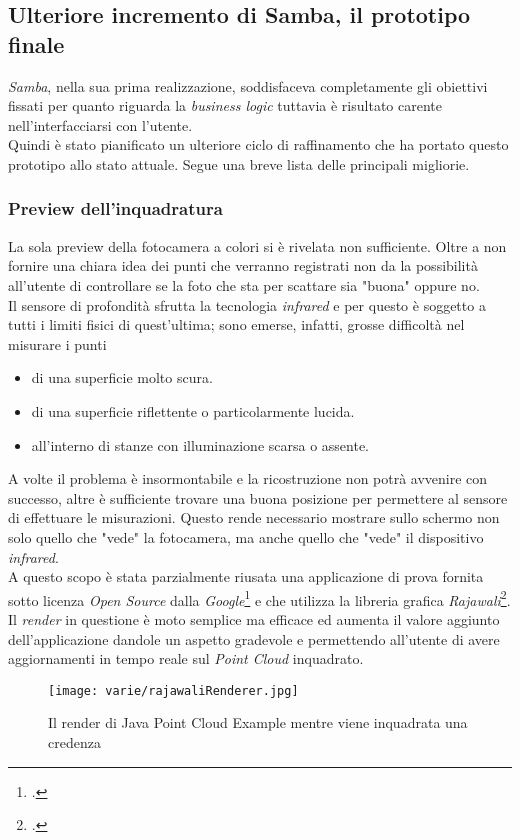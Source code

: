 \subsection{Ulteriore incremento di Samba, il prototipo finale}
\emph{Samba}, nella sua prima realizzazione, soddisfaceva completamente gli obiettivi fissati per quanto riguarda la \emph{business logic} tuttavia è risultato carente nell'interfacciarsi con l'utente.\\
Quindi è stato pianificato un ulteriore ciclo di raffinamento che ha portato questo prototipo allo stato attuale. Segue una breve lista delle principali migliorie.

\subsubsection{Preview dell'inquadratura}
La sola preview della fotocamera a colori si è rivelata non sufficiente. Oltre a non fornire una chiara idea dei punti che verranno registrati non da la possibilità all'utente di controllare se la foto che sta per scattare sia "buona" oppure no.\\
Il sensore di profondità sfrutta la tecnologia \emph{infrared} e per questo è soggetto a tutti i limiti fisici di quest'ultima; sono emerse, infatti, grosse difficoltà nel misurare i punti
\begin{itemize}
	\item di una superficie molto scura.
	\item di una superficie riflettente o particolarmente lucida.
	\item all'interno di stanze con illuminazione scarsa o assente.
\end{itemize}
A volte il problema è insormontabile e la ricostruzione non potrà avvenire con successo, altre è sufficiente trovare una buona posizione per permettere al sensore di effettuare le misurazioni. Questo rende necessario mostrare sullo schermo non solo quello che "vede" la fotocamera, ma anche quello che "vede" il dispositivo \emph{infrared}.\\
A questo scopo è stata parzialmente riusata una applicazione di prova fornita sotto licenza \emph{Open Source} dalla \emph{Google}\footcite{GitHub: https://github.com/googlesamples/tango-examples-java} e che utilizza la libreria grafica \emph{Rajawali}\footcite{GitHub: https://github.com/Rajawali/Rajawali}.\\
Il \emph{render} in questione è moto semplice ma efficace ed aumenta il valore aggiunto dell'applicazione dandole un aspetto gradevole e permettendo all'utente di avere aggiornamenti in tempo reale sul \emph{Point Cloud} inquadrato.
\begin{figure}[!h] 
    \centering 
    \texttt{[image: varie/rajawaliRenderer.jpg]} 
    \caption{Il render di Java Point Cloud Example mentre viene inquadrata una credenza}
\end{figure}


